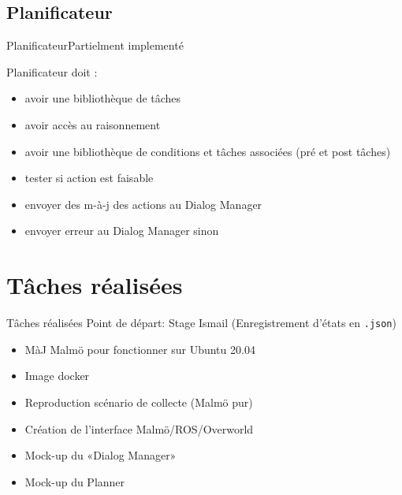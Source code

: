 \documentclass[aspectratio=169]{audition-beamer}
\begin{document}
\subsection{Planificateur}
\begin{frame}{Planificateur}{Partielment implementé }

  \pause
  Planificateur doit :
  \begin{itemize}[<+(1)->]
    \item[\only<9->{\checkmark}] avoir une bibliothèque de tâches
    \item[\only<9->{-- }] avoir accès au raisonnement
    \item[] avoir une bibliothèque de conditions et tâches associées (pré et post tâches)
    \item[] tester si action est faisable
    \item[\only<9->{\checkmark}] envoyer des m-à-j des actions au Dialog Manager
    \item[\only<9->{\checkmark}] envoyer erreur au Dialog Manager sinon
  \end{itemize}
\end{frame}


\section{Tâches réalisées}
\begin{frame}{Tâches réalisées}
  \pause
  \vfill
Point de départ: Stage Ismail (Enregistrement d'états en \texttt{.json})
  \pause
  \vfill
\begin{itemize}[<+(1)->]
  \item MàJ Malmö pour fonctionner sur Ubuntu 20.04
  \item Image docker
  \item Reproduction scénario de collecte (Malmö pur)
  \item Création de l'interface Malmö/ROS/Overworld
  \item Mock-up du «Dialog Manager» 
  \item Mock-up du Planner 
\end{itemize}

\end{frame}
\end{document}
